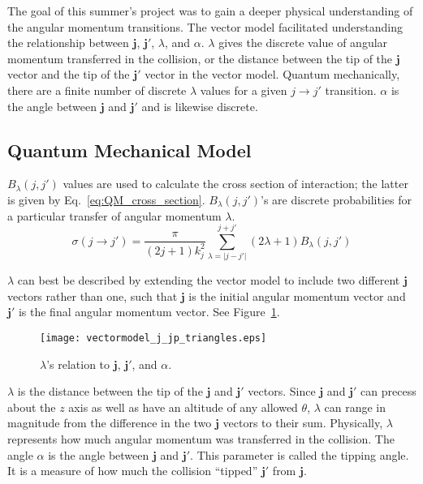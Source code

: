 \documentclass[letterpaper,11pt]{article}
\newcommand{\vectorize}[1]{\boldsymbol{#1}}
\begin{document}
The goal of this summer's project was to gain a deeper physical understanding
of the angular momentum transitions.  The vector model facilitated
understanding the relationship between $\vectorize{j}$, $\vectorize{j'}$,
$\lambda$, and $\alpha$.  $\lambda$ gives the discrete value of angular
momentum transferred in the collision, or the distance between the tip of the
$\vectorize{j}$ vector and the tip of the $\vectorize{j'}$ vector in the vector
model.  Quantum mechanically, there are a finite number of discrete $\lambda$
values for a given $j\rightarrow j'$ transition.  $\alpha$ is the angle between
$\vectorize{j}$ and $\vectorize{j'}$ and is likewise discrete.

\subsection{Quantum Mechanical Model}
$B_\lambda(j,j')$ values are used to calculate the cross section of interaction; the
latter is given by Eq.~\ref{eq:QM_cross_section}.  $B_\lambda(j,j')$'s are discrete
probabilities for a particular transfer of angular momentum $\lambda$.
\begin{equation}
    \sigma(j\rightarrow j')=\frac{\pi}{(2j+1)k_j^2}{\sum_{\lambda=\lvert j-j'\rvert}^{j+j'} {(2\lambda+1)B_\lambda(j,j')}}
    \label{eq:QM_cross_section}
\end{equation}

$\lambda$ can best be described by extending the vector model to include two
different $\vectorize{j}$ vectors rather than one, such that $\vectorize{j}$ is the initial angular
momentum vector and $\vectorize{j'}$ is the final angular momentum vector.  See
Figure~\ref{fig:vectormodel_j_jp}.
\begin{figure}[ht!]
    \centering
    \texttt{[image: vectormodel\_j\_jp\_triangles.eps]}
    \caption{$\lambda$'s relation to $\vectorize{j}$, $\vectorize{j'}$, and $\alpha$.}
\label{fig:vectormodel_j_jp}
\end{figure}
$\lambda$ is the distance between the tip of the $\vectorize{j}$ and $\vectorize{j'}$ vectors.  Since
$\vectorize{j}$ and $\vectorize{j'}$ can precess about the $z$ axis as well as have an altitude of any
allowed $\theta$, $\lambda$ can range in magnitude from the difference in the
two $\vectorize{j}$ vectors to their sum.  Physically, $\lambda$ represents how much
angular momentum was transferred in the collision.  The angle $\alpha$ is the
angle between $\vectorize{j}$ and $\vectorize{j'}$.  This parameter is called the tipping angle.  It is
a measure of how much the collision ``tipped'' $\vectorize{j'}$ from $\vectorize{j}$.
\end{document}
